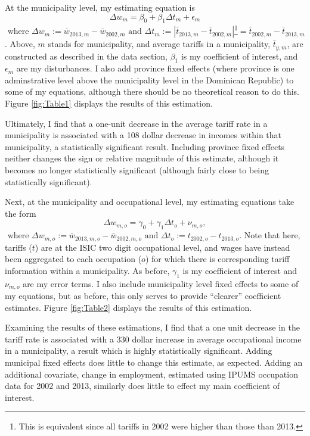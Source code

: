 \documentclass[12pt]{article}
\begin{document}
At the municipality level, my estimating equation is 
\begin{equation}
\Delta w_m = \beta_0 + \beta_1 \Delta t_m + \epsilon_m 
\end{equation}
$\text{~where~}
\Delta w_m := \bar{w}_{2013,m} - \bar{w}_{2002,m} \text{~and~} \Delta t_m := 
\left|\bar{t}_{2013,m}-\bar{t}_{2002,m} \right|$\footnote{This is equivalent
since all tariffs in 2002 were higher than those than 2013.}$= \bar{t}_{2002,m}-\bar{t}_{2013,m}$.
Above, $m$ stands for municipality, and average tariffs in a municipality, $\bar{t}_{y,m}$, 
are constructed as described in the data section, $\beta_1$ is my coefficient of interest,
and $\epsilon_m$ are my disturbances.
I also add province fixed effects (where province is one adminstrative level
above the municipality level in the Dominican Republic) to some of my equations, 
although there should be no theoretical reason to do this. 
Figure \ref{fig:Table1} displays the results of this estimation.

Ultimately, I find that a one-unit decrease in the average tariff rate in a municipality
is associated with a 108 dollar decrease in incomes within that municipality, a 
statistically significant result. Including province fixed effects neither changes the 
sign or relative magnitude of this estimate, although it becomes no longer statistically
significant (although fairly close to being statistically significant).

Next, at the municipality and occupational level, my estimating equations take the form
\begin{equation}
\Delta w_{m,o} = \gamma_0 + \gamma_1 \Delta t_o + \nu_{m,o},
\end{equation}
$\text{~where~}
\Delta w_{m,o} := \bar{w}_{2013,m,o} - \bar{w}_{2002,m,o} \text{~and~} 
\Delta t_o := t_{2002,o}-t_{2013,o}$.
Note that here, tariffs ($t$) are at the ISIC two digit occupational level, and wages 
have instead been aggregated to each occupation ($o$) for which there is
corresponding tariff information within a municipality. As before, $\gamma_1$ is
my coefficient of interest and $\nu_{m,o}$ are my error terms.
I also include municipality level fixed effects to some of my equations, but
as before, this only serves to provide ``clearer'' coefficient estimates.
Figure \ref{fig:Table2} displays the results of this estimation.

Examining the results of these estimations, I find that a one unit 
decrease in the tariff rate is associated with a 330 dollar increase 
in average occupational income in a municipality, a result which is
highly statistically significant. Adding municipal
fixed effects does little to change this estimate, as expected.
Adding an additional covariate, change in employment, estimated
using IPUMS occupation data for 2002 and 2013, similarly does
little to effect my main coefficient of interest.
\end{document}
